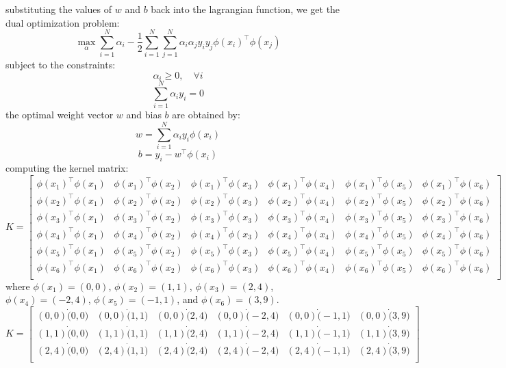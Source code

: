 \documentclass[a3paper,12pt]{article} %
\begin{document}
\begin{enumerate}
\[    \]
    substituting the values of \(w\) and \(b\) back into the lagrangian function, we get the dual optimization problem:
    \[
    \max_{\alpha} \sum^N_{i=1} \alpha_i - \frac{1}{2} \sum^N_{i=1} \sum^N_{j=1} \alpha_i \alpha_j y_i y_j \phi(x_i)^\top \phi(x_j)
    \]
    subject to the constraints:
    \[
    \alpha_i \geq 0, \quad \forall i
    \]
    \[
    \sum^N_{i=1} \alpha_i y_i = 0
    \]
    the optimal weight vector \(w\) and bias \(b\) are obtained by:
    \[
    w = \sum^N_{i=1} \alpha_i y_i \phi(x_i)
    \]
    \[
    b = y_i - w^\top \phi(x_i)
    \]
    computing the kernel matrix:
    \[
    K = \begin{bmatrix}
    \phi(x_1)^\top \phi(x_1) & \phi(x_1)^\top \phi(x_2) & \phi(x_1)^\top \phi(x_3) & \phi(x_1)^\top \phi(x_4) & \phi(x_1)^\top \phi(x_5) & \phi(x_1)^\top \phi(x_6) \\
    \phi(x_2)^\top \phi(x_1) & \phi(x_2)^\top \phi(x_2) & \phi(x_2)^\top \phi(x_3) & \phi(x_2)^\top \phi(x_4) & \phi(x_2)^\top \phi(x_5) & \phi(x_2)^\top \phi(x_6) \\
    \phi(x_3)^\top \phi(x_1) & \phi(x_3)^\top \phi(x_2) & \phi(x_3)^\top \phi(x_3) & \phi(x_3)^\top \phi(x_4) & \phi(x_3)^\top \phi(x_5) & \phi(x_3)^\top \phi(x_6) \\
    \phi(x_4)^\top \phi(x_1) & \phi(x_4)^\top \phi(x_2) & \phi(x_4)^\top \phi(x_3) & \phi(x_4)^\top \phi(x_4) & \phi(x_4)^\top \phi(x_5) & \phi(x_4)^\top \phi(x_6) \\
    \phi(x_5)^\top \phi(x_1) & \phi(x_5)^\top \phi(x_2) & \phi(x_5)^\top \phi(x_3) & \phi(x_5)^\top \phi(x_4) & \phi(x_5)^\top \phi(x_5) & \phi(x_5)^\top \phi(x_6) \\
    \phi(x_6)^\top \phi(x_1) & \phi(x_6)^\top \phi(x_2) & \phi(x_6)^\top \phi(x_3) & \phi(x_6)^\top \phi(x_4) & \phi(x_6)^\top \phi(x_5) & \phi(x_6)^\top \phi(x_6) \\
    \end{bmatrix}
    \]
    where \(\phi(x_1) = (0, 0)\), \(\phi(x_2) = (1, 1)\), \(\phi(x_3) = (2, 4)\), \(\phi(x_4) = (-2, 4)\), \(\phi(x_5) = (-1, 1)\), and \(\phi(x_6) = (3, 9)\).
    \[
    K = \begin{bmatrix}
        (0, 0)\dot (0,0) & (0, 0)\dot (1, 1) & (0, 0)\dot (2, 4) & (0, 0)\dot (-2, 4) & (0, 0)\dot (-1, 1) & (0, 0)\dot (3, 9) \\
        (1, 1)\dot (0,0) & (1, 1)\dot (1, 1) & (1, 1)\dot (2, 4) & (1, 1)\dot (-2, 4) & (1, 1)\dot (-1, 1) & (1, 1)\dot (3, 9) \\
        (2, 4)\dot (0,0) & (2, 4)\dot (1, 1) & (2, 4)\dot (2, 4) & (2, 4)\dot (-2, 4) & (2, 4)\dot (-1, 1) & (2, 4)\dot (3, 9) \\

\end{bmatrix}\]
\end{enumerate}
\end{document}
